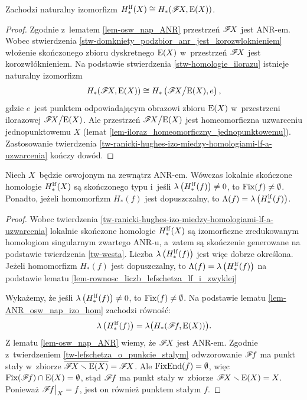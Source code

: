 \begin{lem}\label{lem-ANR_osw_nap_izo_hom}
Zachodzi naturalny izomorfizm $H^{\mathrm{lf}}_*(X)\cong H_*(\mathscr{F}\! X,\mathrm{E}(X))$.
\end{lem}
\begin{proof}
Zgodnie z~lematem \ref{lem-osw_nap_ANR} przestrzeń $\mathscr{F}\! X$ jest \mbox{ANR-em}. Wobec stwierdzenia \ref{stw-domkniety_podzbior_anr_jest_korozwloknieniem} włożenie skończonego zbioru dyskretnego $\mathrm{E}(X)$ w~przestrzeń $\mathscr{F}\! X$ jest korozwłóknieniem. Na podstawie stwierdzenia \ref{stw-homologie_ilorazu} istnieje naturalny izomorfizm \[H_*(\mathscr{F}\! X,\mathrm{E}(X))\cong H_*\left(\mathscr{F}\! X\big /\mathrm{E}(X),e\right),\] gdzie $e$~jest punktem odpowiadającym obrazowi zbioru $\mathrm{E}(X)$ w~przestrzeni ilorazowej $\mathscr{F}\! X\big/\mathrm{E}(X)$. Ale przestrzeń $\mathscr{F}\! X\big/\mathrm{E}(X)$ jest homeomorficzna uzwarceniu jednopunktowemu $X$ (lemat \ref{lem-iloraz_homeomorficzny_jednopunktowemu}). Zastosowanie twierdzenia \ref{tw-ranicki-hughes-izo-miedzy-homologiami-lf-a-uzwarcenia} kończy dowód.
\end{proof}

\begin{tw}\label{tw-lefschetz_fpt_dla_forward_tame}
Niech $X$~będzie oswojonym na zewnątrz \mbox{ANR-em}. Wówczas lokalnie skończone homologie $H_*^{\mathrm{lf}}(X)$ są skończonego typu i~jeśli $\lambda\left(H_*^{\mathrm{lf}}(f)\right)\not=0$, to $\operatorname{Fix}(f)\not=\emptyset$. Ponadto, jeżeli homomorfizm $H_*(f)$ jest dopuszczalny, to $\Lambda(f)=\lambda\left(H_*^{\mathrm{lf}}(f)\right)$.
\end{tw}
\begin{proof}
Wobec twierdzenia \ref{tw-ranicki-hughes-izo-miedzy-homologiami-lf-a-uzwarcenia} lokalnie skończone homologie $H_*^{\mathrm{lf}}(X)$ są izomorficzne zredukowanym homologiom singularnym zwartego \mbox{ANR-u}, a~zatem są skończenie generowane na podstawie twierdzenia \ref{tw-westa}. Liczba $\lambda\left(H_*^{\mathrm{lf}}(f)\right)$ jest więc dobrze określona. Jeżeli homomorfizm $H_*(f)$ jest dopuszczalny, to $\Lambda(f)=\lambda\left(H_*^{\mathrm{lf}}(f)\right)$ na podstawie lematu \ref{lem-rownosc_liczb_lefschetza_lf_i_zwyklej}

Wykażemy, że jeśli $\lambda\left(H_*^{\mathrm{lf}}(f)\right)\not=0$, to $\operatorname{Fix}(f)\not=\emptyset$. Na podstawie lematu \ref{lem-ANR_osw_nap_izo_hom} zachodzi równość: \[\lambda\left(H_*^{\mathrm{lf}}(f)\right)=\lambda\big(H_*(\mathscr{F}\! f, \mathrm{E}(X))\big).\] Z lematu \ref{lem-osw_nap_ANR} wiemy, że $\mathscr{F}\! X$ jest \mbox{ANR-em}. Zgodnie z~twierdzeniem \ref{tw-lefschetza_o_punkcie_stalym} odwzorowanie $\mathscr{F}\! f$ ma punkt stały w~zbiorze $\overline{\mathscr{F}\! X\smallsetminus \mathrm{E}(X)}=\mathscr{F}\! X$. Ale $\operatorname{FixEnd}(f)=\emptyset$, więc $\operatorname{Fix}(\mathscr{F}\! f)\cap \mathrm{E}(X)=\emptyset$, stąd $\mathscr{F}\! f$ ma punkt stały w~zbiorze $\mathscr{F}\! X\smallsetminus \mathrm{E}(X)=X$. Ponieważ $\mathscr{F}\! f\big|_X=f$, jest on również punktem stałym $f$.
\end{proof}

